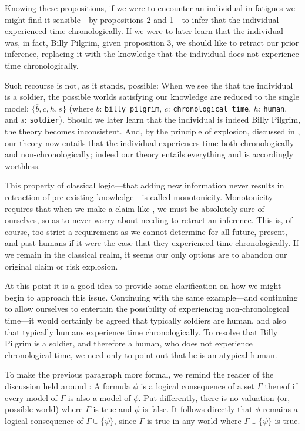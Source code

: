 Knowing these propositions, if we were to encounter an individual in fatigues we might find it sensible---by propositions 2 and 1---to infer that the individual experienced time chronologically. If we were to later learn that the individual was, in fact, Billy Pilgrim, given proposition 3, we should like to retract our prior inference, replacing it with the knowledge that the individual does not experience time chronologically.

Such recourse is not, as it stands, possible: When we see the that the individual is a soldier, the possible worlds satisfying our knowledge are reduced to the single model: $\{\overline{b},c,h,s\}$ (where $b$: \texttt{billy pilgrim}, $c$: \texttt{chronological time}. $h$: \texttt{human}, and $s$: \texttt{soldier}). Should we later learn that the individual is indeed Billy Pilgrim, the theory becomes inconsistent.
And, by the principle of explosion, discussed in , our theory now entails that the individual experiences time both chronologically and non-chronologically; indeed our theory entails everything and is accordingly worthless.

This property of classical logic---that adding new information never results in retraction of pre-existing knowledge---is called monotonicity. Monotonicity requires that when we make a claim like , we must be absolutely sure of ourselves, so as to never worry about needing to retract an inference. This is, of course, too strict a requirement as we cannot determine for all future, present, and past humans if it were the case that they experienced time chronologically. If we remain in the classical realm, it seems our only options are to abandon our original claim or risk explosion.

At this point it is a good idea to provide some clarification on how we might begin to approach this issue. Continuing with the same example---and continuing to allow ourselves to entertain the possibility of experiencing non-chronological time---it would certainly be agreed that typically soldiers are human, and also that typically humans experience time chronologically. To resolve that Billy Pilgrim is a soldier, and therefore a human, who does not experience chronological time, we need only to point out that he is an atypical human.

To make the previous paragraph more formal, we remind the reader of the discussion held around : A formula $\phi$ is a logical consequence of a set $\Gamma$ thereof if every model of $\Gamma$ is also a model of $\phi$. Put differently, there is no valuation (or, possible world) where $\Gamma$ is true and $\phi$ is false. It follows directly that $\phi$ remains a logical consequence of $\Gamma \cup \{\psi\}$, since $\Gamma$ is true in any world where $\Gamma \cup \{\psi\}$ is true.

